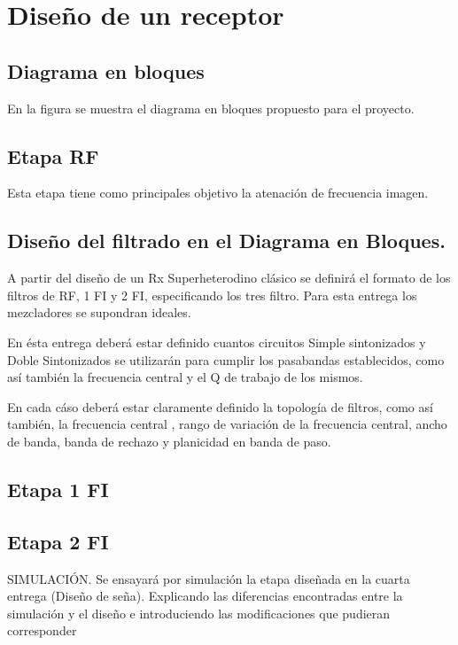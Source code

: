 \section{Diseño de un receptor}

\subsection{Diagrama en bloques}

En la figura se muestra el diagrama en bloques propuesto para el proyecto. 




\subsection{Etapa RF}

Esta etapa tiene como principales objetivo la atenación de frecuencia imagen.


\subsection{Diseño del filtrado en el Diagrama en Bloques.} 

A partir del diseño de un Rx Superheterodino clásico se definirá el formato de los filtros de RF, 1 FI y 2 FI, especificando los tres filtro.
Para esta entrega los mezcladores se supondran ideales. 

En ésta entrega deberá estar definido cuantos circuitos  Simple sintonizados y Doble Sintonizados se utilizarán para cumplir los pasabandas establecidos, como así también la frecuencia central y el Q de trabajo de los mismos.

En cada cáso deberá estar claramente definido la topología de filtros, como así también, la frecuencia central , rango de variación de la frecuencia central, ancho de banda, banda de rechazo y planicidad  en banda de paso.



\subsection{Etapa 1 FI}

\subsection{Etapa 2 FI}


SIMULACIÓN.
Se ensayará por simulación la etapa diseñada en la cuarta entrega (Diseño de seña). Explicando las diferencias encontradas entre la simulación y el diseño e introduciendo las modificaciones que pudieran corresponder

